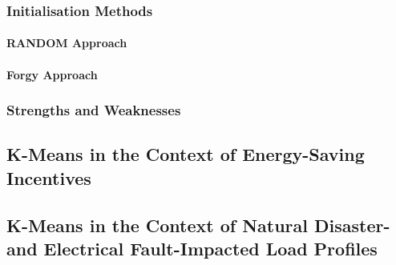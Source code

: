 \subsubsection{Initialisation Methods}
\paragraph{RANDOM Approach}
\paragraph{Forgy Approach}
\subsubsection{Strengths and Weaknesses}


\subsection*{K-Means in the Context of Energy-Saving Incentives}

\subsection*{K-Means in the Context of Natural Disaster- and Electrical Fault-Impacted Load Profiles}
